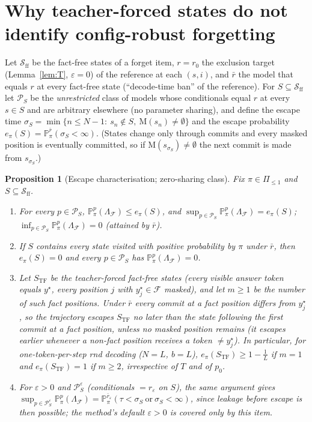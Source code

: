 \documentclass[11pt]{article}
\newtheorem{proposition}{Proposition}
\newcommand{\F}{\mathcal{F}}
\newcommand{\Prob}{\mathbb{P}}
\newcommand{\M}{\mathrm{M}}
\begin{document}
\section{Why teacher-forced states do not identify config-robust forgetting}
Let $\mathcal{S}_{\mathrm{ff}}$ be the fact-free states of a forget item, $r=r_0$ the exclusion target (Lemma~\ref{lem:T}, $\varepsilon=0$)
of the reference at each $(s,i)$, and $\bar r$ the model that equals $r$ at every fact-free state (``decode-time ban'' of the reference).
For $S\subseteq\mathcal{S}_{\mathrm{ff}}$ let $\mathcal{P}_S$ be the \emph{unrestricted} class of models whose conditionals equal $r$ at
every $s\in S$ and are arbitrary elsewhere (no parameter sharing), and define the escape time $\sigma_S=\min\{n\le N-1:\ s_n\notin S,\ \M(s_n)\neq\emptyset\}$
and the escape probability $e_\pi(S)=\Prob^{\bar r}_\pi(\sigma_S<\infty)$. (States change only through commits and every
masked position is eventually committed, so if $\M(s_{\sigma_S})\neq\emptyset$ the next commit is made from $s_{\sigma_S}$.)
\begin{proposition}[Escape characterisation; zero-sharing class]\label{prop:escape}
Fix $\pi\in\Pi_{\le1}$ and $S\subseteq\mathcal{S}_{\mathrm{ff}}$.
\begin{enumerate}
\item[(a)] For every $p\in\mathcal{P}_S$, $\Prob^p_\pi(\Lambda_\F)\le e_\pi(S)$, and $\sup_{p\in\mathcal{P}_S}\Prob^p_\pi(\Lambda_\F)=e_\pi(S)$;
$\inf_{p\in\mathcal{P}_S}\Prob^p_\pi(\Lambda_\F)=0$ (attained by $\bar r$).
\item[(b)] If $S$ contains every state visited with positive probability by $\pi$ under $\bar r$, then $e_\pi(S)=0$ and every
$p\in\mathcal{P}_S$ has $\Prob^p_\pi(\Lambda_\F)=0$.
\item[(c)] Let $S_{\mathrm{TF}}$ be the teacher-forced fact-free states (every visible answer token equals $y^\star$, every
position $j$ with $y^\star_j\in\F$ masked), and let $m\ge1$ be the number of such fact positions. Under $\bar r$ every commit at a fact
position differs from $y^\star_j$, so the trajectory escapes $S_{\mathrm{TF}}$ no later than the state following the first commit
at a fact position, unless no masked position remains (it escapes earlier whenever a non-fact position receives a token $\neq y^\star_j$). In particular, for one-token-per-step rnd decoding ($N=L$, $b=L$),
$e_\pi(S_{\mathrm{TF}})\ge 1-\frac{1}{L}$ if $m=1$ and $e_\pi(S_{\mathrm{TF}})=1$ if $m\ge2$, irrespective of $T$ and of $p_0$.
\item[(d)] For $\varepsilon>0$ and $\mathcal{P}^\varepsilon_S$ (conditionals $=r_\varepsilon$ on $S$), the same argument gives
$\sup_{p\in\mathcal{P}^\varepsilon_S}\Prob^p_\pi(\Lambda_\F)=\Prob^{\bar r_\varepsilon}_\pi(\tau<\sigma_S\ \text{or}\ \sigma_S<\infty)$, since leakage before
escape is then possible; the method's default $\varepsilon>0$ is covered only by this item.
\end{enumerate}
\end{proposition}
\end{document}
